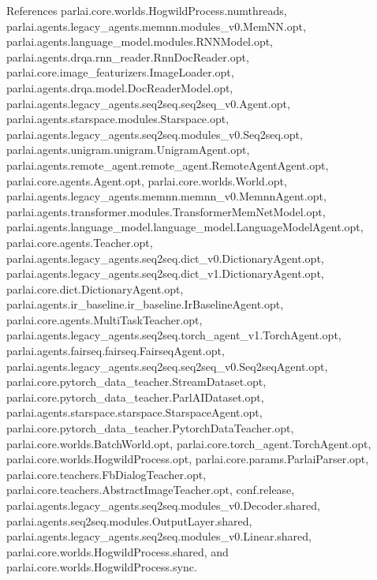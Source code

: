 References parlai.\+core.\+worlds.\+Hogwild\+Process.\+numthreads, parlai.\+agents.\+legacy\+\_\+agents.\+memnn.\+modules\+\_\+v0.\+Mem\+N\+N.\+opt, parlai.\+agents.\+language\+\_\+model.\+modules.\+R\+N\+N\+Model.\+opt, parlai.\+agents.\+drqa.\+rnn\+\_\+reader.\+Rnn\+Doc\+Reader.\+opt, parlai.\+core.\+image\+\_\+featurizers.\+Image\+Loader.\+opt, parlai.\+agents.\+drqa.\+model.\+Doc\+Reader\+Model.\+opt, parlai.\+agents.\+legacy\+\_\+agents.\+seq2seq.\+seq2seq\+\_\+v0.\+Agent.\+opt, parlai.\+agents.\+starspace.\+modules.\+Starspace.\+opt, parlai.\+agents.\+legacy\+\_\+agents.\+seq2seq.\+modules\+\_\+v0.\+Seq2seq.\+opt, parlai.\+agents.\+unigram.\+unigram.\+Unigram\+Agent.\+opt, parlai.\+agents.\+remote\+\_\+agent.\+remote\+\_\+agent.\+Remote\+Agent\+Agent.\+opt, parlai.\+core.\+agents.\+Agent.\+opt, parlai.\+core.\+worlds.\+World.\+opt, parlai.\+agents.\+legacy\+\_\+agents.\+memnn.\+memnn\+\_\+v0.\+Memnn\+Agent.\+opt, parlai.\+agents.\+transformer.\+modules.\+Transformer\+Mem\+Net\+Model.\+opt, parlai.\+agents.\+language\+\_\+model.\+language\+\_\+model.\+Language\+Model\+Agent.\+opt, parlai.\+core.\+agents.\+Teacher.\+opt, parlai.\+agents.\+legacy\+\_\+agents.\+seq2seq.\+dict\+\_\+v0.\+Dictionary\+Agent.\+opt, parlai.\+agents.\+legacy\+\_\+agents.\+seq2seq.\+dict\+\_\+v1.\+Dictionary\+Agent.\+opt, parlai.\+core.\+dict.\+Dictionary\+Agent.\+opt, parlai.\+agents.\+ir\+\_\+baseline.\+ir\+\_\+baseline.\+Ir\+Baseline\+Agent.\+opt, parlai.\+core.\+agents.\+Multi\+Task\+Teacher.\+opt, parlai.\+agents.\+legacy\+\_\+agents.\+seq2seq.\+torch\+\_\+agent\+\_\+v1.\+Torch\+Agent.\+opt, parlai.\+agents.\+fairseq.\+fairseq.\+Fairseq\+Agent.\+opt, parlai.\+agents.\+legacy\+\_\+agents.\+seq2seq.\+seq2seq\+\_\+v0.\+Seq2seq\+Agent.\+opt, parlai.\+core.\+pytorch\+\_\+data\+\_\+teacher.\+Stream\+Dataset.\+opt, parlai.\+core.\+pytorch\+\_\+data\+\_\+teacher.\+Parl\+A\+I\+Dataset.\+opt, parlai.\+agents.\+starspace.\+starspace.\+Starspace\+Agent.\+opt, parlai.\+core.\+pytorch\+\_\+data\+\_\+teacher.\+Pytorch\+Data\+Teacher.\+opt, parlai.\+core.\+worlds.\+Batch\+World.\+opt, parlai.\+core.\+torch\+\_\+agent.\+Torch\+Agent.\+opt, parlai.\+core.\+worlds.\+Hogwild\+Process.\+opt, parlai.\+core.\+params.\+Parlai\+Parser.\+opt, parlai.\+core.\+teachers.\+Fb\+Dialog\+Teacher.\+opt, parlai.\+core.\+teachers.\+Abstract\+Image\+Teacher.\+opt, conf.\+release, parlai.\+agents.\+legacy\+\_\+agents.\+seq2seq.\+modules\+\_\+v0.\+Decoder.\+shared, parlai.\+agents.\+seq2seq.\+modules.\+Output\+Layer.\+shared, parlai.\+agents.\+legacy\+\_\+agents.\+seq2seq.\+modules\+\_\+v0.\+Linear.\+shared, parlai.\+core.\+worlds.\+Hogwild\+Process.\+shared, and parlai.\+core.\+worlds.\+Hogwild\+Process.\+sync.



